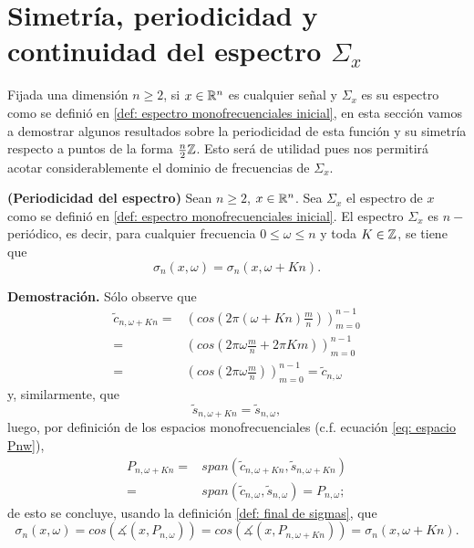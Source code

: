 \section{Simetría, periodicidad y continuidad del espectro $\Sigma_{x}$}
\label{sec: simetria, periodicidad, continuidad}
Fijada una dimensión $n \geq 2$,
si $x \in \mathbb{R}^{n}$ es cualquier señal y 
$\Sigma_{x}$
es su espectro como se definió en
\ref{def: espectro monofrecuenciales inicial},
en esta sección vamos a demostrar 
algunos resultados sobre la periodicidad 
de esta función y su simetría 
respecto a puntos de la forma
$\frac{n}{2} \mathbb{Z}$.
Esto será de utilidad pues nos permitirá
acotar considerablemente el dominio de frecuencias
de $\Sigma_{x}$.



\begin{prop}
\label{prop: periodicidad espectro}
\textbf{(Periodicidad del espectro)}
Sean $n \geq 2$, $x \in \mathbb{R}^{n}$.
Sea $\Sigma_{x}$ el espectro de $x$ como se definió en 
\eqref{def: espectro monofrecuenciales inicial}.
El espectro $\Sigma_{x}$ es $n-$periódico, es decir, 
para cualquier frecuencia
$0 \leq \omega \leq n$
y toda $K \in \mathbb{Z}$, se tiene que 
\[
\sigma_{n}(x, \omega) = \sigma_{n}(x, \omega + Kn).
\]
\end{prop}
\noindent
\textbf{Demostración.}
Sólo observe que 
\begin{align*}
\tilde{c}_{n, \omega + Kn} = & \left( cos \left( 2 \pi
\left( \omega + Kn \right) \frac{m}{n} \right) \right)_{m=0}^{n-1} \\
= & \left( cos \left( 
2 \pi \omega \frac{m}{n} + 2 \pi K m
\right) \right)_{m=0}^{n-1} \\
= & \left( cos \left( 
2 \pi \omega \frac{m}{n}
\right) \right)_{m=0}^{n-1} = \tilde{c}_{n, \omega}
\end{align*}
y, similarmente, que 
\[
\tilde{s}_{n, \omega + Kn} = \tilde{s}_{n, \omega},
\]
luego, por definición de los espacios monofrecuenciales
(c.f. ecuación \ref{eq: espacio Pnw}),
\begin{align*}
P_{n, \omega + Kn} =
& span(\tilde{c}_{n, \omega + Kn}, \tilde{s}_{n, \omega + Kn}) \\
= & span(\tilde{c}_{n, \omega }, \tilde{s}_{n, \omega }) = P_{n, \omega};
\end{align*}
de esto se concluye, usando la definición
\ref{def: final de sigmas},
que 
\[
\sigma_{n}(x, \omega) = 
cos (\measuredangle(x, P_{n, \omega}))
= cos (\measuredangle(x, P_{n, \omega + Kn})) = 
\sigma_{n}(x, \omega + Kn).
\]
\QEDB
\vspace{0.2cm}

